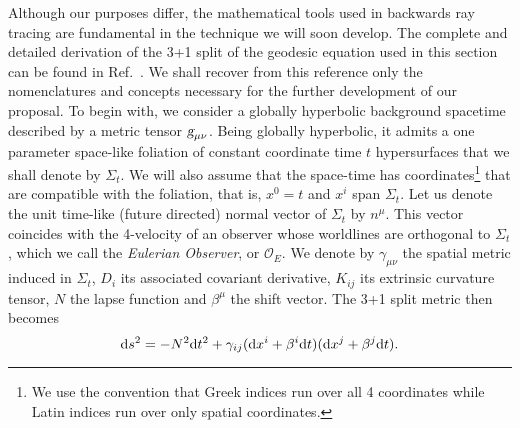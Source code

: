 Although our purposes differ, the mathematical tools used in backwards ray tracing are fundamental in the technique we will soon develop. The complete and detailed derivation of the 3+1 split of the geodesic equation used in this section can be found in Ref.~\cite{Vincent_2012}. We shall recover from this reference only the nomenclatures and concepts necessary for the further development of our proposal. To begin with, we consider a globally hyperbolic background spacetime described by a metric tensor $\mtrtens{\mu}{\nu}$. Being globally hyperbolic, it admits a one parameter space-like foliation of constant coordinate time $t$ hypersurfaces that we shall denote by $\Sigma_t$. We will also assume that the space-time has coordinates\footnote{We use the convention that Greek indices run over all 4 coordinates while Latin indices run over only spatial coordinates.} that are compatible with the foliation, that is, $x^0=t$ and $x^i$ span $\Sigma_t$. Let us denote the unit time-like (future directed) normal vector of $\Sigma_t$ by $n^\mu$. This vector coincides with the 4-velocity of an observer whose worldlines are orthogonal to $\Sigma_t$, which we call the \emph{Eulerian Observer}, or $\mathcal{O}_E$. We denote by $\gamma_{\mu\nu}$ the spatial metric induced in $\Sigma_t$, $D_i$ its associated covariant derivative, $K_{ij}$ its extrinsic curvature tensor, $N$ the lapse function and $\beta^\mu$ the shift vector. The 3+1 split metric then becomes
%
\begin{equation}
  \mathrm{d} s^2 = -N^2 \mathrm{d} t^2 + \gamma_{ij}(\mathrm{d} x^i + \beta^i \mathrm{d} t)(\mathrm{d} x^j + \beta^j \mathrm{d} t).
  \label{eq:arbitrary_penrose_decomposed_metric}
\end{equation}

